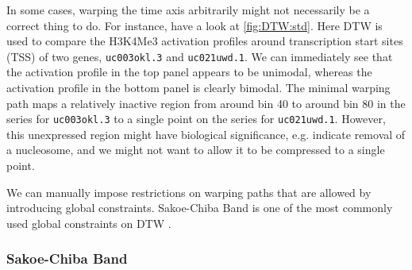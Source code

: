 \documentclass[parskip]{cs4rep}
\newcommand{\gene}[1]{{\tt #1}}
\newcommand{\histonemodification}[1]{#1}
\begin{document}
In some cases, warping the time axis arbitrarily might not necessarily be a correct thing to do.
For instance, have a look at \autoref{fig:DTW:std}. Here DTW is used to compare the \histonemodification{H3K4Me3} activation profiles around transcription start sites (TSS) of two genes, \gene{uc003okl.3} and \gene{uc021uwd.1}. We can immediately see that the activation profile in the top panel appears to be unimodal, whereas the activation profile in the bottom panel is clearly bimodal. The minimal warping path maps a relatively inactive region from around bin 40 to around bin 80 in the series for \gene{uc003okl.3} to a single point on the series for \gene{uc021uwd.1}. However, this unexpressed region might have biological significance, e.g. indicate removal of a nucleosome, and we might not want to allow it to be compressed to a single point. 

We can manually impose restrictions on warping paths that are allowed by introducing global constraints. Sakoe-Chiba Band is one of the most commonly used global constraints on DTW \citep{Ratanamahatana:2004wu}. 

\subsubsection{Sakoe-Chiba Band}
\end{document}
